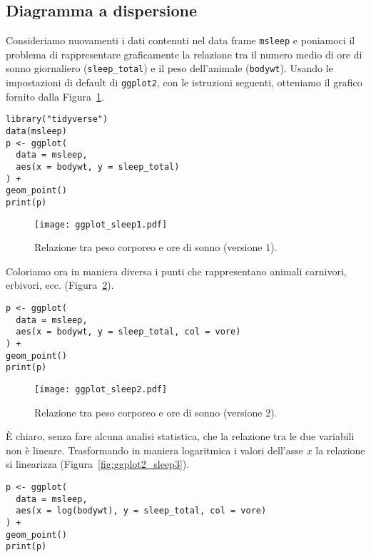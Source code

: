 \subsection{Diagramma a dispersione}

Consideriamo nuovamenti i dati contenuti nel data frame \verb+msleep+ 
e poniamoci il problema di rappresentare graficamente la relazione tra il numero medio di ore di sonno giornaliero (\verb+sleep_total+) e il peso dell'animale (\verb+bodywt+). 
Usando le impostazioni di default di \verb+ggplot2+, con le istruzioni seguenti, otteniamo il grafico fornito dalla Figura~\ref{fig:ggplot2_sleep1}.
\begin{lstlisting}
library("tidyverse")
data(msleep)
p <- ggplot(
  data = msleep,
  aes(x = bodywt, y = sleep_total)
) +
geom_point()
print(p)
\end{lstlisting}

\begin{figure}[h!]
   \centering
    \texttt{[image: ggplot\_sleep1.pdf]}
   \caption{Relazione tra peso corporeo e ore di sonno (versione 1).}
    \label{fig:ggplot2_sleep1}
\end{figure}
  
\noindent
Coloriamo ora in maniera diversa i punti che rappresentano animali carnivori, erbivori, ecc. (Figura~\ref{fig:ggplot2_sleep2}).
\begin{lstlisting}
p <- ggplot(
  data = msleep,
  aes(x = bodywt, y = sleep_total, col = vore)
) +
geom_point()
print(p)
\end{lstlisting}

\begin{figure}[h!]
   \centering
    \texttt{[image: ggplot\_sleep2.pdf]}
   \caption{Relazione tra peso corporeo e ore di sonno (versione 2).}
    \label{fig:ggplot2_sleep2}
\end{figure}

\noindent
È chiaro, senza fare alcuna analisi statistica, che la relazione tra le due variabili non è lineare. 
Trasformando in maniera logaritmica i valori dell'asse $x$ la relazione si linearizza (Figura~\ref{fig:ggplot2_sleep3}).
\begin{lstlisting}
p <- ggplot(
  data = msleep,
  aes(x = log(bodywt), y = sleep_total, col = vore)
) +
geom_point()
print(p)
\end{lstlisting}

